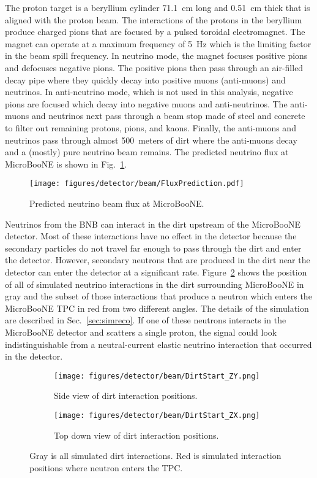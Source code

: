   The proton target is a beryllium cylinder 71.1~cm long and 0.51~cm thick that
  is aligned with the proton beam. The interactions of the protons in the
  beryllium produce charged pions that are focused by a pulsed toroidal
  electromagnet. The magnet can operate at a maximum frequency of 5~Hz which is
  the limiting factor in the beam spill frequency. In neutrino mode, the magnet
  focuses positive pions and defocuses negative pions. The positive pions then
  pass through an air-filled decay pipe where they quickly decay into positive
  muons (anti-muons) and neutrinos. In anti-neutrino mode, which is not used in
  this analysis, negative pions are focused which decay into negative muons and
  anti-neutrinos. The anti-muons and neutrinos next pass through a beam stop
  made of steel and concrete to filter out remaining protons, pions, and kaons.
  Finally, the anti-muons and neutrinos pass through almost 500~meters of dirt
  where the anti-muons decay and a (mostly) pure neutrino beam remains. The
  predicted neutrino flux at MicroBooNE is shown in Fig.~\ref{fig:beamflux}.

  \begin{figure}[h]
    \centering
    \texttt{[image: figures/detector/beam/FluxPrediction.pdf]}
    \caption{Predicted neutrino beam flux at MicroBooNE.}
    \label{fig:beamflux}
  \end{figure}

  Neutrinos from the BNB can interact in the dirt upstream of the MicroBooNE
  detector. Most of these interactions have no effect in the detector because
  the secondary particles do not travel far enough to pass through the dirt
  and enter the detector. However, secondary neutrons that are produced in
  the dirt near the detector can enter the detector at a significant rate.
  Figure~\ref{fig:dirtstart} shows the position of all of simulated neutrino
  interactions in the dirt surrounding MicroBooNE in gray and the subset of
  those interactions that produce a neutron which enters the MicroBooNE TPC
  in red from two different angles. The details of the simulation are
  described in Sec.~\ref{sec:simreco}. If one of these neutrons interacts in
  the MicroBooNE detector and scatters a single proton, the signal could look
  indistinguishable from a neutral-current elastic neutrino interaction that
  occurred in the detector.

  \begin{figure}[h]
    \centering
    \begin{subfigure}{2.5in}
      \texttt{[image: figures/detector/beam/DirtStart\_ZY.png]}
      \caption{Side view of dirt interaction positions.}
    \end{subfigure}
    \hspace{2pt}
    \begin{subfigure}{2.5in}
      \texttt{[image: figures/detector/beam/DirtStart\_ZX.png]}
      \caption{Top down view of dirt interaction positions.}
    \end{subfigure}
    \caption{Gray is all simulated dirt interactions. Red is simulated
    interaction positions where neutron enters the TPC.}
    \label{fig:dirtstart}
  \end{figure}

